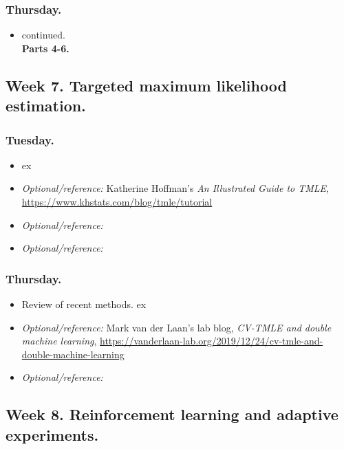 \documentclass[letterpaper, 12pt, parskip=full,DIV=10]{scrartcl}
\begin{document}
\subsubsection*{Thursday.}
\begin{itemize}
\item \cite{chernozhukov2018double} continued.  \\
\textbf{Parts 4-6.}%
\end{itemize}



\subsection*{Week 7. Targeted maximum likelihood estimation.}
\subsubsection*{Tuesday.}

\begin{itemize}
\item {}  ex
\item   \textit{Optional/reference:} Katherine Hoffman's \emph{An Illustrated Guide to TMLE}, \url{https://www.khstats.com/blog/tmle/tutorial}
\item  \textit{Optional/reference:}  
\item  \textit{Optional/reference:}  
\end{itemize}

\subsubsection*{Thursday.}

\begin{itemize}
\item Review of recent methods.   ex
\item   \textit{Optional/reference:} Mark van der Laan's lab blog, \emph{CV-TMLE and double machine learning}, \url{https://vanderlaan-lab.org/2019/12/24/cv-tmle-and-double-machine-learning}
\item \textit{Optional/reference:}  
\end{itemize}

\subsection*{Week 8. Reinforcement learning and adaptive experiments.}
\end{document}
